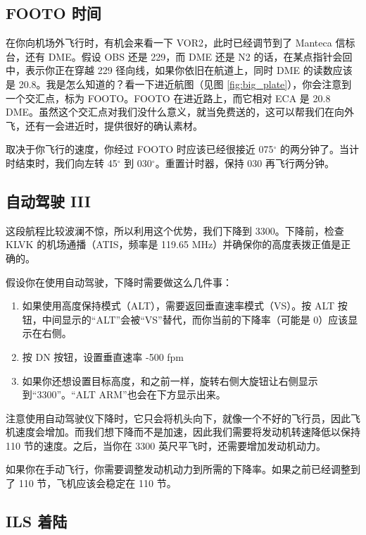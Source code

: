 \subsection{FOOTO 时间}

在你向机场外飞行时，有机会来看一下 VOR2，此时已经调节到了 Manteca 信标台，还有 DME。假设 OBS 还是 229，而 DME 还是 N2 的话，在某点指针会回中，表示你正在穿越 229 径向线，如果你依旧在航道上，同时 DME 的读数应该是 20.8。我是怎么知道的？看一下进近航图（见图 \ref{fig:big_plate}），你会注意到一个交汇点，标为 FOOTO。FOOTO 在进近路上，而它相对 ECA 是 20.8 DME。虽然这个交汇点对我们没什么意义，就当免费送的，这可以帮我们在向外飞，还有一会进近时，提供很好的确认素材。

取决于你飞行的速度，你经过 FOOTO 时应该已经很接近 075$^\circ$ 的两分钟了。当计时结束时，我们向左转 45$^\circ$ 到  030$^\circ$。重置计时器，保持 030 再飞行两分钟。

\subsection{自动驾驶 III}

这段航程比较波澜不惊，所以利用这个优势，我们下降到 3300。下降前，检查 KLVK 的机场通播（ATIS，频率是 119.65 MHz）并确保你的高度表拨正值是正确的。

假设你在使用自动驾驶，下降时需要做这么几件事：

\begin{enumerate}
\item 如果使用高度保持模式（ALT），需要返回垂直速率模式（VS）。按 ALT 按钮，中间显示的“ALT”会被“VS”替代，而你当前的下降率（可能是 0）应该显示在右侧。
\item 按 DN 按钮，设置垂直速率 -500 fpm
\item 如果你还想设置目标高度，和之前一样，旋转右侧大旋钮让右侧显示到“3300”。“ALT ARM”也会在下方显示出来。
\end{enumerate}

注意使用自动驾驶仪下降时，它只会将机头向下，就像一个不好的飞行员，因此飞机速度会增加。而我们想下降而不是加速，因此我们需要将发动机转速降低以保持 110 节的速度。之后，当你在 3300 英尺平飞时，还需要增加发动机动力。

如果你在手动飞行，你需要调整发动机动力到所需的下降率。如果之前已经调整到了 110 节，飞机应该会稳定在 110 节。

\subsection{ILS 着陆}

